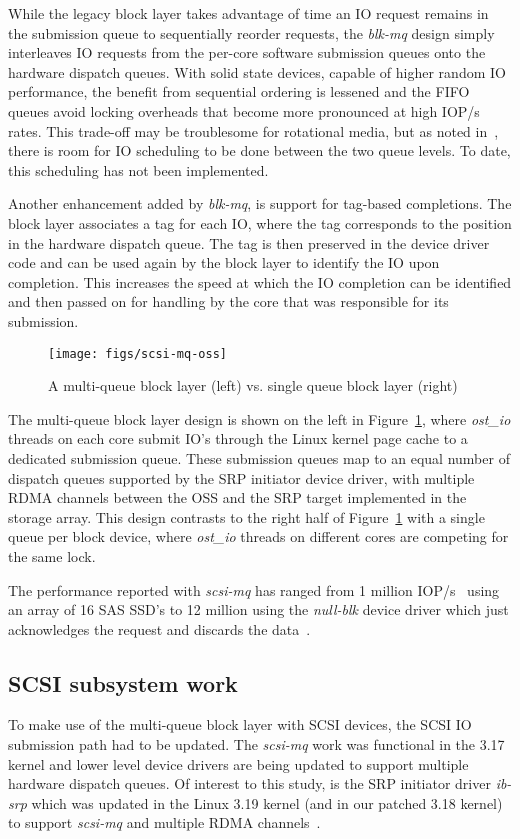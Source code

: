 \documentclass[conference]{IEEEtran}
\begin{document}
While the legacy block layer takes advantage of time an IO request remains in the submission queue to sequentially reorder requests, the \emph{blk-mq} design simply interleaves IO requests from the per-core software submission queues onto the hardware dispatch queues. With solid state devices, capable of higher random IO performance, the benefit from sequential ordering is lessened and the FIFO queues avoid locking overheads that become more
pronounced at high IOP/s rates. This trade-off may be troublesome for rotational media, but as noted in~\cite{bjorling13}, there is room for IO scheduling to be done between the two queue levels. To date, this scheduling has not been implemented.

Another enhancement added by \emph{blk-mq}, is support for tag-based completions.  The block layer associates a tag for
each IO, where the tag corresponds to the position in the hardware dispatch queue. The tag is then preserved in the device driver code and can be used again by the block layer
to identify the IO upon completion. This increases the speed at which the IO completion can be identified and then passed on for handling by the core
that was responsible for its submission.

\begin{figure}[!t]
\centering
\texttt{[image: figs/scsi-mq-oss]}
\caption{A multi-queue block layer (left) vs. single queue block layer (right)}
\label{fig_scsi-mq}
\end{figure}

The multi-queue block layer design is shown on the left in Figure~\ref{fig_scsi-mq}, where \emph{ost\_io} threads on each core submit IO's through the Linux kernel page cache to a dedicated submission queue. These submission queues map to an equal number of dispatch queues supported by the SRP initiator device driver, with multiple RDMA channels between the OSS and the SRP target implemented in the storage array. This design contrasts to the right half of Figure~\ref{fig_scsi-mq} with a single queue per block device, where \emph{ost\_io} threads on different cores are competing for the same lock.
 
The performance reported with \emph{scsi-mq} has ranged from 1 million IOP/s~\cite{hellwig14} using an array of 16 SAS SSD's to 12 million using the \emph{null-blk} device driver which just acknowledges the request and discards the data~\cite{bjorling13}.

\subsection{SCSI subsystem work}
To make use of the multi-queue block layer with SCSI devices, the SCSI IO submission path had to be updated. The \emph{scsi-mq} work was
functional in the 3.17 kernel and lower level device drivers are being updated to support multiple hardware dispatch queues.
Of interest to this study, is the SRP initiator driver \emph{ib-srp} which was updated in the Linux 3.19 kernel (and in our patched 3.18 kernel) 
to support \emph{scsi-mq} and multiple RDMA channels~\cite{assche15}.
\end{document}
